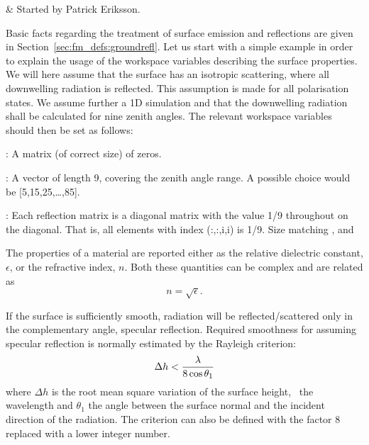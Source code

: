  \label{sec:surface}


 & Started by Patrick Eriksson. \\
\stophistory


Basic facts regarding the treatment of surface emission and
reflections are given in Section~\ref{sec:fm_defs:groundrefl}.  Let us
start with a simple example in order to explain the usage of the
workspace variables describing the surface properties. We will here
assume that the surface has an isotropic scattering, where all
downwelling radiation is reflected. This assumption is made for all
polarisation states. We assume further a 1D simulation and that the
downwelling radiation shall be calculated for nine zenith angles. The
relevant workspace variables should then be set as follows:
  
 : A matrix (of correct size) of zeros.

 : A vector of length 9, covering the zenith
 angle range. A possible choice would be [5,15,25,\dots,85].
 
 : Each reflection matrix is a diagonal
 matrix with the value 1/9 throughout on the diagonal. That is, all
 elements with index (:,:,i,i) is 1/9. Size matching
 ,  and



 The properties of a material are reported either as the relative
 dielectric constant, $\epsilon$, or the refractive index, $n$. Both
 these quantities can be complex and are related as
 \begin{equation}
   \label{eq:rte_eps2n}
   n = \sqrt{\epsilon}.
 \end{equation}


 \label{sec:rte:surface:specular}
 
 If the surface is sufficiently smooth, radiation will be
 reflected/scattered only in the complementary angle, specular
 reflection. Required smoothness for assuming specular reflection is
 normally estimated by the Rayleigh criterion:
 \begin{equation}
   \label{eq:rte:rayleigh}
   \Delta h < \frac{\lambda}{8\cos\theta_1}
 \end{equation}
 where $\Delta h$ is the root mean square variation of the surface
 height, \Wvl\ the wavelength and $\theta_1$ the angle between the
 surface normal and the incident direction of the radiation. The
 criterion can also be defined with the factor 8 replaced with a lower
 integer number.
 
